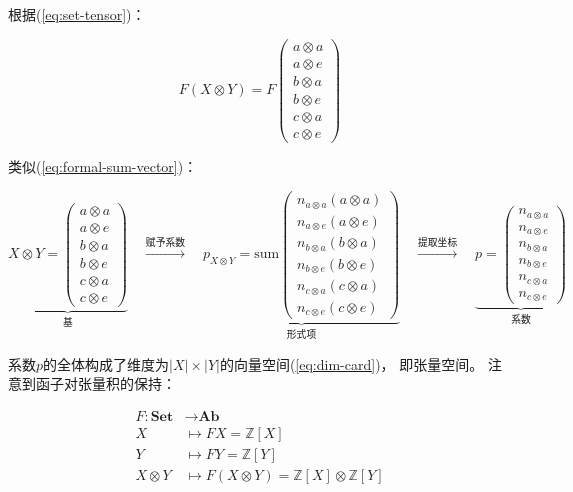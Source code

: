 \documentclass[10pt, openany]{book}
\begin{document}
根据(\ref{eq:set-tensor})：

$$
F(X \otimes Y)
=F\begin{pmatrix}a \otimes a \\ a \otimes e \\ b \otimes a \\ b \otimes e \\ c \otimes a \\ c \otimes e\end{pmatrix}
$$

类似(\ref{eq:formal-sum-vector})：

\begin{equation}
\underbrace{X \otimes Y=\begin{pmatrix}a \otimes a \\ a \otimes e \\ b \otimes a \\ b \otimes e \\ c \otimes a \\ c \otimes e\end{pmatrix}}_{\text{基}}
\quad \xrightarrow{\text{赋予系数}} \quad
\underbrace{p_{X \otimes Y}=\text{sum}\begin{pmatrix}n_{a \otimes a}(a \otimes a) \\ n_{a \otimes e}(a \otimes e) \\ n_{b \otimes a}(b \otimes a) \\ n_{b \otimes e}(b \otimes e) \\ n_{c \otimes a}(c \otimes a) \\ n_{c \otimes e}(c \otimes e)\end{pmatrix}}_{\text{形式项}}
\quad \xrightarrow{\text{提取坐标}} \quad
\underbrace{p=\begin{pmatrix}n_{a \otimes a} \\ n_{a \otimes e} \\ n_{b \otimes a} \\ n_{b \otimes e} \\ n_{c \otimes a} \\ n_{c \otimes e}\end{pmatrix}}_{\text{系数}}
\end{equation}

系数$p$的全体构成了维度为$|X| \times |Y|$的向量空间(\ref{eq:dim-card})，
即张量空间。
注意到函子对张量积的保持：

$$
\begin{aligned}
F: \textbf{Set} &\to \textbf{Ab} \\
X &\mapsto FX = \mathbb Z[X] \\
Y &\mapsto FY = \mathbb Z[Y] \\
X \otimes Y &\mapsto F(X \otimes Y) = \mathbb Z[X] \otimes \mathbb Z[Y] \\
\end{aligned}
$$
\end{document}
